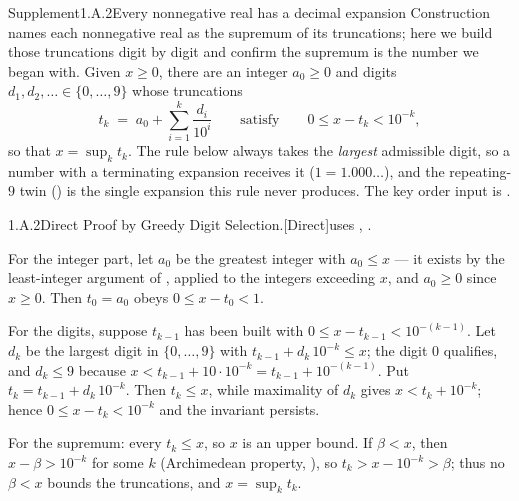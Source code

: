 \documentclass[main.tex]{subfiles}
\begin{document}
\begin{ObjL}{Supplement}{1.A.2}{Every nonnegative real has a decimal expansion}
Construction  names each nonnegative real as the supremum of its truncations; here we
build those truncations digit by digit and confirm the supremum is the number we began with. Given
$x\ge 0$, there are an integer $a_0\ge 0$ and digits $d_1,d_2,\dots\in\{0,\dots,9\}$ whose
truncations
\[ t_k\;=\;a_0+\sum_{i=1}^{k}\frac{d_i}{10^{i}} \qquad\text{satisfy}\qquad 0\le x-t_k<10^{-k}, \]
so that $x=\sup_k t_k$. The rule below always takes the \emph{largest} admissible digit, so a
number with a terminating expansion receives it ($1=1.000\ldots$), and the repeating-$9$ twin
() is the single expansion this rule never produces. The key order input is
.
\end{ObjL}
\begin{Prf}{1.A.2}{Direct Proof by Greedy Digit Selection.}{[Direct]\quad uses , .}
\item For the integer part, let $a_0$ be the greatest integer with $a_0\le x$ --- it exists by the
  least-integer argument of , applied to the integers exceeding $x$, and $a_0\ge 0$
  since $x\ge 0$. Then $t_0=a_0$ obeys $0\le x-t_0<1$.
\item For the digits, suppose $t_{k-1}$ has been built with $0\le x-t_{k-1}<10^{-(k-1)}$. Let $d_k$ be
  the largest digit in $\{0,\dots,9\}$ with $t_{k-1}+d_k\,10^{-k}\le x$; the digit $0$ qualifies, and
  $d_k\le 9$ because $x<t_{k-1}+10\cdot 10^{-k}=t_{k-1}+10^{-(k-1)}$. Put $t_k=t_{k-1}+d_k\,10^{-k}$.
  Then $t_k\le x$, while maximality of $d_k$ gives $x<t_k+10^{-k}$; hence $0\le x-t_k<10^{-k}$ and
  the invariant persists.
\item For the supremum: every $t_k\le x$, so $x$ is an upper bound. If $\beta<x$, then
  $x-\beta>10^{-k}$ for some $k$ (Archimedean property, ), so
  $t_k>x-10^{-k}>\beta$; thus no $\beta<x$ bounds the truncations, and $x=\sup_k t_k$.
\end{Prf}

\ifSubfilesClassLoaded{\clearpage\objindex}{}
\end{document}
